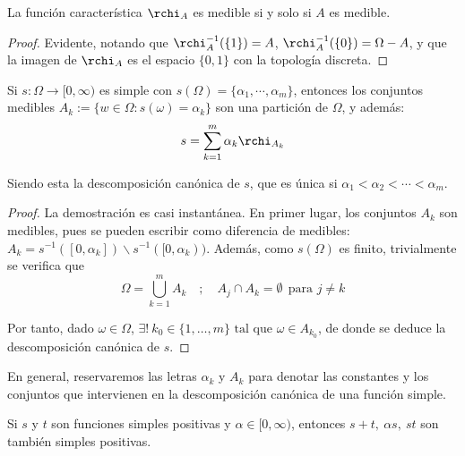 \begin{nprop} \label{chi} La función característica $\rchi_A$ es medible si y solo si $A$ es medible.
\end{nprop}

\begin{proof}
	Evidente, notando que $\rchi^{-1}_A(\{1\}) = A$, $\rchi^{-1}_A(\{0\}) = \Omega - A$, y que la imagen de $\rchi_A$ es el espacio $\{0,1\}$ con la topología discreta.
\end{proof}

\begin{nprop}
  Si $s:\Omega \to [0,\infty)$ es simple con \mbox{$s(\Omega) =  \{\alpha_1,\cdots, \alpha_m\}$}, entonces los conjuntos medibles $A_k:= \{w \in \Omega: s(\omega)= \alpha_k\}$ son una partición de $\Omega$, y además:
  \[
    s = \sum_{k=1}^m \alpha_k \rchi_{A_k}
  \]

  Siendo esta la descomposición canónica de $s$, que es única si $\alpha_1 < \alpha_2 <  \cdots <\alpha_m$.
\end{nprop}

\begin{proof} La demostración es casi instantánea. En primer lugar, los conjuntos $A_k$ son medibles, pues se pueden escribir como diferencia de medibles: \mbox{$A_k = s^{-1}([0,\alpha_k])\backslash s^{-1}([0,\alpha_k))$.} Además, como $s(\Omega)$ es finito, trivialmente se verifica que $$\Omega = \bigcup_{k=1}^m A_k \quad ; \quad A_j \cap A_k = \emptyset \ \ \text{para } j \ne k$$

  Por tanto, dado $\omega \in \Omega$, $\exists ! \ k_0 \in \{1,\dots,m\} \text{ tal que } \omega \in A_{k_0}$, de donde se deduce la descomposición canónica de $s$.
\end{proof}

En general, reservaremos las letras $\alpha_k$ y $A_k$ para denotar las constantes y los conjuntos que intervienen en la descomposición canónica de una función simple.


\begin{nprop} \label{propsimples}
  Si $s$ y $t$ son funciones simples positivas y $\alpha \in [0,\infty)$, entonces $s+t, \ \alpha s, \ st$ son también simples positivas.
\end{nprop}

